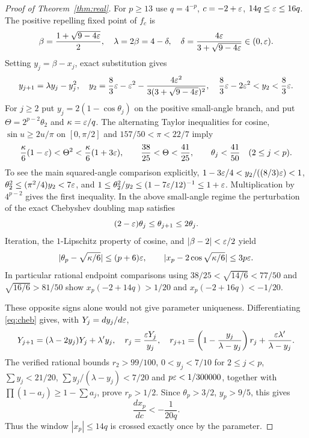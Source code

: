 \begin{proof}[Proof of Theorem~\ref{thm:real}]
For $p\ge13$ use $q=4^{-p}$, $c=-2+\varepsilon$,
$14q\le\varepsilon\le16q$.  The positive repelling
fixed point of $f_c$ is
\[
 \beta=\frac{1+\sqrt{9-4\varepsilon}}2,\quad
 \lambda=2\beta=4-\delta,\quad
 \delta=\frac{4\varepsilon}{3+\sqrt{9-4\varepsilon}}\in(0,\varepsilon).
\]
Setting $y_j=\beta-x_j$, exact substitution gives
\begin{equation}\label{eq:cheb}
 y_{j+1}=\lambda y_j-y_j^2,\quad
 y_2=\frac83\varepsilon-\varepsilon^2-
 \frac{4\varepsilon^2}{3(3+\sqrt{9-4\varepsilon})^2},\quad
 \frac83\varepsilon-2\varepsilon^2<y_2<\frac83\varepsilon.
\end{equation}
For $j\ge2$ put $y_j=2(1-\cos\theta_j)$
on the positive small-angle branch, and put
$\Theta=2^{p-2}\theta_2$ and $\kappa=\varepsilon/q$.
The alternating Taylor inequalities for cosine,
$\sin u\ge2u/\pi$ on $[0,\pi/2]$ and
$157/50<\pi<22/7$ imply
\begin{equation}\label{eq:angle-bds}
 \frac{\kappa}{6}(1-\varepsilon)<\Theta^2
 <\frac{\kappa}{6}(1+3\varepsilon),\qquad
 \frac{38}{25}<\Theta<\frac{41}{25},\qquad
 \theta_j<\frac{41}{50}\quad(2\le j<p).
\end{equation}
To see the main squared-angle comparison explicitly,
$1-3\varepsilon/4<y_2/((8/3)\varepsilon)<1$,
$\theta_2^2\le(\pi^2/4)y_2<7\varepsilon$,
and $1\le\theta_2^2/y_2
\le(1-7\varepsilon/12)^{-1}\le1+\varepsilon$.
Multiplication by $4^{p-2}$ gives the first inequality.
In the above small-angle regime the perturbation of the
exact Chebyshev doubling map satisfies
\[
 (2-\varepsilon)\theta_j\le\theta_{j+1}\le2\theta_j.
\]
Iteration, the $1$-Lipschitz property of cosine,
and $|\beta-2|<\varepsilon/2$ yield
\begin{equation}\label{eq:escape}
 |\theta_p-\sqrt{\kappa/6}|\le(p+6)\varepsilon,\qquad
 |x_p-2\cos\sqrt{\kappa/6}|\le3p\varepsilon.
\end{equation}
In particular rational endpoint comparisons using
$38/25<\sqrt{14/6}<77/50$ and
$\sqrt{16/6}>81/50$ show
$x_p(-2+14q)>1/20$ and
$x_p(-2+16q)<-1/20$.

These opposite signs alone would not give
parameter uniqueness.  Differentiating
\eqref{eq:cheb} gives, with $Y_j=dy_j/d\varepsilon$,
\[
 Y_{j+1}=(\lambda-2y_j)Y_j+\lambda' y_j,\quad
 r_j=\frac{\varepsilon Y_j}{y_j},\quad
 r_{j+1}=\left(1-\frac{y_j}{\lambda-y_j}\right)r_j+
 \frac{\varepsilon\lambda'}{\lambda-y_j}.
\]
The verified rational bounds
$r_2>99/100$, $0<y_j<7/10$ for $2\le j<p$,
$\sum y_j<21/20$,
$\sum y_j/(\lambda-y_j)<7/20$ and
$p\varepsilon<1/300000$, together with
$\prod(1-a_j)\ge1-\sum a_j$,
prove $r_p>1/2$.  Since $\theta_p>3/2$,
$y_p>9/5$, this gives
\begin{equation}\label{eq:slope}
 \frac{dx_p}{dc}<-\frac{1}{20q}.
\end{equation}
Thus the window $|x_p|\le14q$ is
crossed exactly once by the parameter.


\end{proof}
